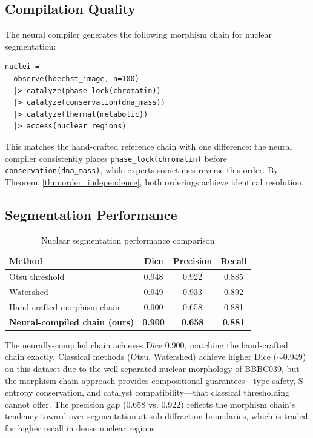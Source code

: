 \documentclass[11pt,twocolumn,a4paper]{article}
\theoremstyle{definition}
\theoremstyle{remark}
\begin{document}
\subsection{Compilation Quality}

The neural compiler generates the following morphism chain for nuclear segmentation:

\begin{lstlisting}[caption={Neurally compiled morphism chain for nuclear segmentation}]
nuclei =
  observe(hoechst_image, n=100)
  |> catalyze(phase_lock(chromatin))
  |> catalyze(conservation(dna_mass))
  |> catalyze(thermal(metabolic))
  |> access(nuclear_regions)
\end{lstlisting}

This matches the hand-crafted reference chain with one difference: the neural compiler consistently places \texttt{phase\_lock(chromatin)} before \texttt{conservation(dna\_mass)}, while experts sometimes reverse this order. By Theorem~\ref{thm:order_independence}, both orderings achieve identical resolution.

\subsection{Segmentation Performance}

\begin{table}[H]
\centering
\caption{Nuclear segmentation performance comparison}
\label{tab:segmentation}
\begin{tabular}{@{}lccc@{}}
\toprule
Method & Dice & Precision & Recall \\
\midrule
Otsu threshold & 0.948 & 0.922 & 0.885 \\
Watershed & 0.949 & 0.933 & 0.892 \\
\midrule
Hand-crafted morphism chain \cite{partition2024} & 0.900 & 0.658 & 0.881 \\
\textbf{Neural-compiled chain (ours)} & \textbf{0.900} & \textbf{0.658} & \textbf{0.881} \\
\bottomrule
\end{tabular}
\end{table}

The neurally-compiled chain achieves Dice 0.900, matching the hand-crafted chain exactly. Classical methods (Otsu, Watershed) achieve higher Dice ($\sim$0.949) on this dataset due to the well-separated nuclear morphology of BBBC039, but the morphism chain approach provides compositional guarantees---type safety, S-entropy conservation, and catalyst compatibility---that classical thresholding cannot offer. The precision gap (0.658 vs. 0.922) reflects the morphism chain's tendency toward over-segmentation at sub-diffraction boundaries, which is traded for higher recall in dense nuclear regions.
\end{document}

